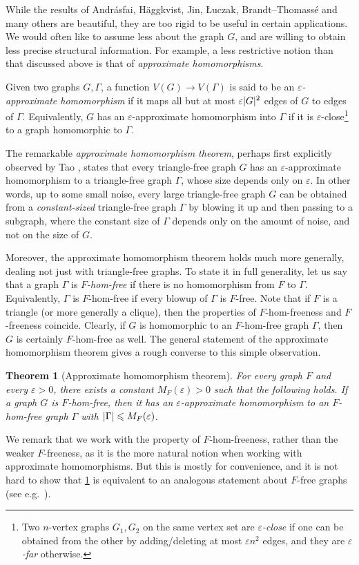 \documentclass[reqno, english, 12pt]{amsart}
\theoremstyle{plain}
\newtheorem{theorem}{Theorem}[section]
\theoremstyle{remark}
\DeclarePairedDelimiter{\abs}{\lvert}{\rvert}
\renewcommand{\leq}{\leqslant}
\begin{document}
While the results of Andr\'asfai, H\"aggkvist, Jin, \L uczak, Brandt--Thomass\'e and many others are beautiful, they are too rigid to be useful in certain applications. We would often like to assume less about the graph $G$, and are willing to obtain less precise structural information. For example, a less restrictive notion than that discussed above is that of \emph{approximate homomorphisms}. 

Given two graphs $G, \Gamma$, a function $V(G) \to V(\Gamma)$ is said to be an \emph{$\varepsilon$-approximate homomorphism} if it maps all but at most $\varepsilon \abs G^2$ edges of $G$ to edges of $\Gamma$. Equivalently, $G$ has an $\varepsilon$-approximate homomorphism into $\Gamma$ if it is $\varepsilon$-close\footnote{Two $n$-vertex graphs $G_1,G_2$ on the same vertex set are \emph{$\varepsilon$-close} if one can be obtained from the other by adding/deleting at most $\varepsilon n^2$ edges, and they are \emph{$\varepsilon$-far} otherwise.} to a graph homomorphic to $\Gamma$.

The remarkable \emph{approximate homomorphism theorem}, perhaps first explicitly observed by Tao \cite{MR2259060}, states that every triangle-free graph $G$ has an $\varepsilon$-approximate homomorphism to a triangle-free graph $\Gamma$, whose size depends only on $\varepsilon$.
In other words, up to some small noise, every large triangle-free graph $G$ can be obtained from a \emph{constant-sized} triangle-free graph $\Gamma$ by blowing it up and then passing to a subgraph, where the constant size of $\Gamma$ depends only on the amount of noise, and not on the size of $G$.

Moreover, the approximate homomorphism theorem holds much more generally, dealing not just with triangle-free graphs. To state it in full generality, let us say that 
a graph $\Gamma$ is {\em $F$-hom-free} if there is no homomorphism from $F$ to $\Gamma$. Equivalently, $\Gamma$ is $F$-hom-free if every blowup of $\Gamma$ is $F$-free. Note that if $F$ is a triangle (or more generally a clique), then the properties of $F$-hom-freeness and $F$-freeness coincide.
Clearly, if $G$ is homomorphic to an $F$-hom-free graph $\Gamma$, then $G$ is certainly $F$-hom-free as well. The general statement of the approximate homomorphism theorem gives a rough converse to this simple observation.
\begin{theorem}[Approximate homomorphism theorem]\label{thm:approx hom}
	For every graph $F$ and every $\varepsilon>0$, there exists a constant $M_F(\varepsilon)>0$ such that the following holds. If a graph $G$ is $F$-hom-free, then it has an $\varepsilon$-approximate homomorphism to an $F$-hom-free graph $\Gamma$ with $\abs \Gamma \leq M_F(\varepsilon)$.
\end{theorem}
We remark that we work with the property of $F$-hom-freeness, rather than the weaker $F$-freeness, as it is the more natural notion when working with approximate homomorphisms. But this is mostly for convenience, and it is not hard to show that \cref{thm:approx hom} is equivalent to an analogous statement about $F$-free graphs (see e.g.\ \cite{FZ}).
\end{document}

